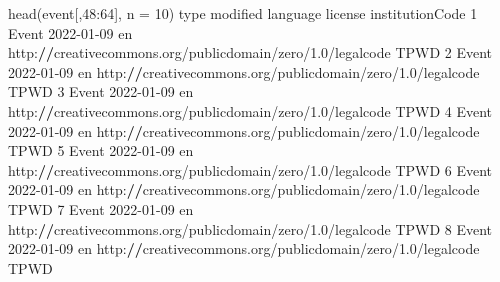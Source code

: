 \documentclass[
]{book}
\newenvironment{Shaded}{\begin{snugshade}}{\end{snugshade}}
\newcommand{\AttributeTok}[1]{\textcolor[rgb]{0.77,0.63,0.00}{#1}}
\newcommand{\DecValTok}[1]{\textcolor[rgb]{0.00,0.00,0.81}{#1}}
\newcommand{\ErrorTok}[1]{\textcolor[rgb]{0.64,0.00,0.00}{\textbf{#1}}}
\newcommand{\FloatTok}[1]{\textcolor[rgb]{0.00,0.00,0.81}{#1}}
\newcommand{\FunctionTok}[1]{\textcolor[rgb]{0.00,0.00,0.00}{#1}}
\newcommand{\NormalTok}[1]{#1}
\newcommand{\SpecialCharTok}[1]{\textcolor[rgb]{0.00,0.00,0.00}{#1}}
\begin{document}
\begin{Shaded}
\begin{Highlighting}[]
\FunctionTok{head}\NormalTok{(event[,}\DecValTok{48}\SpecialCharTok{:}\DecValTok{64}\NormalTok{], }\AttributeTok{n =} \DecValTok{10}\NormalTok{)}
\NormalTok{    type   modified language                                                    license institutionCode}
\DecValTok{1}\NormalTok{  Event }\DecValTok{2022{-}01{-}09}\NormalTok{       en http}\SpecialCharTok{:}\ErrorTok{//}\NormalTok{creativecommons.org}\SpecialCharTok{/}\NormalTok{publicdomain}\SpecialCharTok{/}\NormalTok{zero}\SpecialCharTok{/}\FloatTok{1.0}\SpecialCharTok{/}\NormalTok{legalcode            TPWD}
\DecValTok{2}\NormalTok{  Event }\DecValTok{2022{-}01{-}09}\NormalTok{       en http}\SpecialCharTok{:}\ErrorTok{//}\NormalTok{creativecommons.org}\SpecialCharTok{/}\NormalTok{publicdomain}\SpecialCharTok{/}\NormalTok{zero}\SpecialCharTok{/}\FloatTok{1.0}\SpecialCharTok{/}\NormalTok{legalcode            TPWD}
\DecValTok{3}\NormalTok{  Event }\DecValTok{2022{-}01{-}09}\NormalTok{       en http}\SpecialCharTok{:}\ErrorTok{//}\NormalTok{creativecommons.org}\SpecialCharTok{/}\NormalTok{publicdomain}\SpecialCharTok{/}\NormalTok{zero}\SpecialCharTok{/}\FloatTok{1.0}\SpecialCharTok{/}\NormalTok{legalcode            TPWD}
\DecValTok{4}\NormalTok{  Event }\DecValTok{2022{-}01{-}09}\NormalTok{       en http}\SpecialCharTok{:}\ErrorTok{//}\NormalTok{creativecommons.org}\SpecialCharTok{/}\NormalTok{publicdomain}\SpecialCharTok{/}\NormalTok{zero}\SpecialCharTok{/}\FloatTok{1.0}\SpecialCharTok{/}\NormalTok{legalcode            TPWD}
\DecValTok{5}\NormalTok{  Event }\DecValTok{2022{-}01{-}09}\NormalTok{       en http}\SpecialCharTok{:}\ErrorTok{//}\NormalTok{creativecommons.org}\SpecialCharTok{/}\NormalTok{publicdomain}\SpecialCharTok{/}\NormalTok{zero}\SpecialCharTok{/}\FloatTok{1.0}\SpecialCharTok{/}\NormalTok{legalcode            TPWD}
\DecValTok{6}\NormalTok{  Event }\DecValTok{2022{-}01{-}09}\NormalTok{       en http}\SpecialCharTok{:}\ErrorTok{//}\NormalTok{creativecommons.org}\SpecialCharTok{/}\NormalTok{publicdomain}\SpecialCharTok{/}\NormalTok{zero}\SpecialCharTok{/}\FloatTok{1.0}\SpecialCharTok{/}\NormalTok{legalcode            TPWD}
\DecValTok{7}\NormalTok{  Event }\DecValTok{2022{-}01{-}09}\NormalTok{       en http}\SpecialCharTok{:}\ErrorTok{//}\NormalTok{creativecommons.org}\SpecialCharTok{/}\NormalTok{publicdomain}\SpecialCharTok{/}\NormalTok{zero}\SpecialCharTok{/}\FloatTok{1.0}\SpecialCharTok{/}\NormalTok{legalcode            TPWD}
\DecValTok{8}\NormalTok{  Event }\DecValTok{2022{-}01{-}09}\NormalTok{       en http}\SpecialCharTok{:}\ErrorTok{//}\NormalTok{creativecommons.org}\SpecialCharTok{/}\NormalTok{publicdomain}\SpecialCharTok{/}\NormalTok{zero}\SpecialCharTok{/}\FloatTok{1.0}\SpecialCharTok{/}\NormalTok{legalcode            TPWD}

\end{Highlighting}
\end{Shaded}
\end{document}
